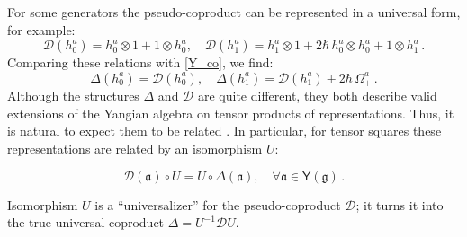 \documentclass[10pt]{article}
\theoremstyle{definition}
\def\fa{\mathfrak{a}}
\def\fg{\mathfrak{g}}
\def\myY{{\mathsf{Y}}}
\def\sD{{\mathscr{D}}}
\numberwithin{equation}{section}
\begin{document}
For some generators the pseudo-coproduct can be represented in a universal form, for example:
\begin{equation}
	\sD(h_0^a)=h_0^a\otimes 1+1\otimes h_0^a,\quad \sD(h_1^a)=h_1^a\otimes 1+2\hbar\, h_0^a\otimes h_0^a+1\otimes h_1^a\,.
\end{equation}
Comparing these relations with \eqref{Y_co}, we find:
\begin{equation}\label{small_sD}
	\Delta\left(h_0^a\right)=\sD\left(h_0^a\right),\quad \Delta\left(h_1^a\right)=\sD\left(h_1^a\right)+2\hbar\,\Omega_+^a\,.
\end{equation}
Although the structures $\Delta$ and $\sD$ are quite different, they both describe valid extensions of the Yangian algebra on tensor products of representations.
Thus, it is natural to expect them to be related \cite{Galakhov:2022uyu}.
In particular, for tensor squares these representations are related by an isomorphism $U$:
\begin{tcolorbox}
\begin{equation}\label{univ}
	\sD(\fa)\circ U=U\circ \Delta(\fa),\quad \forall \fa\in \myY(\fg)\,.
\end{equation}
\end{tcolorbox}
\noindent Isomorphism $U$ is a ``universalizer''  for the pseudo-coproduct $\sD$; it turns it into the true universal  coproduct $\Delta=U^{-1}\sD U$.
\end{document}
